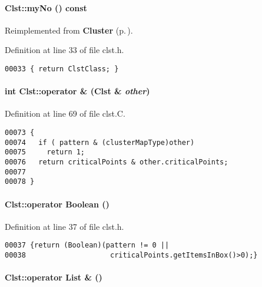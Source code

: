 \paragraph{ Clst::my\-No () const\hspace{0.3cm}{\tt  [inline, virtual]}}\hfill



Reimplemented from {\bf Cluster} {\rm (p.\,\pageref{Cluster_a3})}.

Definition at line 33 of file clst.h.\small\begin{verbatim}00033 { return ClstClass; }
\end{verbatim}\normalsize 
\label{Clst_a9}
\paragraph{\setlength{\rightskip}{0pt plus 5cm}int Clst::operator \& (Clst \& {\em other})}\hfill



Definition at line 69 of file clst.C.\small\begin{verbatim}00073 {
00074   if ( pattern & (clusterMapType)other)
00075     return 1;
00076   return criticalPoints & other.criticalPoints;
00077 
00078 }
\end{verbatim}\normalsize 
\label{Clst_a6}
\paragraph{\setlength{\rightskip}{0pt plus 5cm}Clst::operator {\bf Boolean} ()\hspace{0.3cm}{\tt  [inline]}}\hfill



Definition at line 37 of file clst.h.\small\begin{verbatim}00037 {return (Boolean)(pattern != 0 || 
00038                    criticalPoints.getItemsInBox()>0);}
\end{verbatim}\normalsize 
\label{Clst_a7}
\paragraph{\setlength{\rightskip}{0pt plus 5cm}Clst::operator {\bf List} \& ()\hspace{0.3cm}{\tt  [inline]}}\hfill




